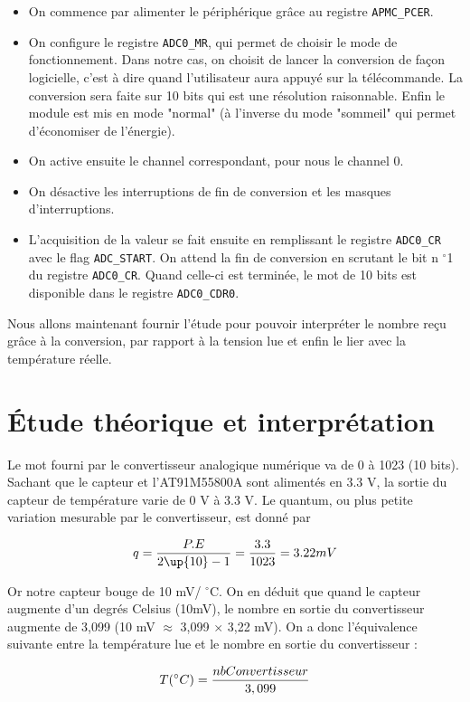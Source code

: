 \documentclass[a4paper]{report}
\begin{document}
\begin{itemize}
\item On commence par alimenter le périphérique grâce au registre \texttt{APMC\_PCER}.
\item On configure le registre \texttt{ADC0\_MR}, qui permet de choisir le mode de fonctionnement. Dans notre cas, on choisit de lancer la conversion de façon logicielle, c'est à dire quand l'utilisateur aura appuyé sur la télécommande. La conversion sera faite sur 10 bits qui est une résolution raisonnable. Enfin le module est mis en mode "normal" (à l'inverse du mode "sommeil" qui permet d'économiser de l'énergie).
\item On active ensuite le channel correspondant, pour nous le channel 0.
\item On désactive les interruptions de fin de conversion et les masques d'interruptions.
\item L'acquisition de la valeur se fait ensuite en remplissant le registre \texttt{ADC0\_CR} avec le flag \texttt{ADC\_START}. On attend la fin de conversion en scrutant le bit n $^\circ$1 du registre \texttt{ADC0\_CR}. Quand celle-ci est terminée, le mot de 10 bits est disponible dans le registre \texttt{ADC0\_CDR0}.
\end{itemize}

Nous allons maintenant fournir l'étude pour pouvoir interpréter le nombre reçu grâce à la conversion, par rapport à la tension lue et enfin le lier avec la température réelle.

\section{Étude théorique et interprétation}
Le mot fourni par le convertisseur analogique numérique va de 0 à 1023 (10 bits). Sachant que le capteur et l'AT91M55800A sont alimentés en 3.3 V, la sortie du capteur de température varie de 0 V à 3.3 V. Le quantum, ou plus petite variation mesurable par le convertisseur, est donné par

\[
q = {P.E \over 2\up{10}-1} = {3.3 \over 1023} = 3.22 mV
\]

Or notre capteur bouge de 10 mV/ $^\circ$C. On en déduit que quand le capteur augmente d'un degrés Celsius (10mV), le nombre en sortie du convertisseur augmente de 3,099 (10 mV $\approx$ 3,099 $\times$ 3,22 mV). On a donc l'équivalence suivante entre la température lue et le nombre en sortie du convertisseur :

\[
T(^\circ C) = {nbConvertisseur \over 3,099}
\]
\end{document}
